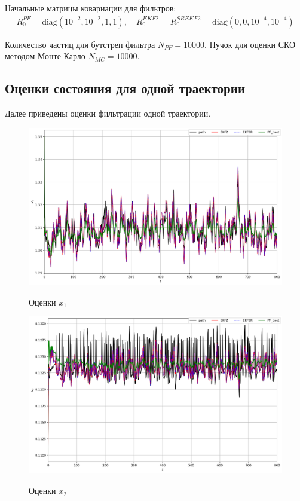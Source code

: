 \documentclass[a4paper,12pt]{article}
\begin{document}
Начальные матрицы ковариации для фильтров:
\begin{gather*}
    R_0^{PF} = \mathrm{diag}(10^{-2}, 10^{-2}, 1, 1),\quad R_0^{EKF2} = R_0^{SREKF2} = \mathrm{diag}(0, 0, 10^{-4}, 10^{-4})
\end{gather*}

Количество частиц для бутстреп фильтра $N_{PF} = 10000$. Пучок для оценки СКО методом Монте-Карло $N_{MC} = 10000$.

\subsection{Оценки состояния для одной траектории}
Далее приведены оценки фильтрации одной траектории.

\begin{landscape}
\begin{figure}[p]
\centering
\caption{Оценки $x_1$}
\includegraphics[width=0.95\linewidth]{x1.png}
\label{fig:x1}
\end{figure}

\begin{figure}[p]
\centering
\caption{Оценки $x_2$}
\includegraphics[width=0.95\linewidth]{x2.png}
\label{fig:x2}
\end{figure}
\end{landscape}
\end{document}
